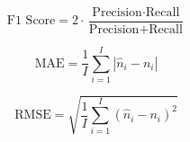 \[
\text{F1 Score} = 2 \cdot \frac{\text{Precision} \cdot \text{Recall}}{\text{Precision} + \text{Recall}}
\]

\[
\text{MAE} = \frac{1}{I} \sum_{i=1}^{I} \left| \hat{n}_i - n_i \right|
\]

\[
\text{RMSE} = \sqrt{\frac{1}{I} \sum_{i=1}^{I} \left( \hat{n}_i - n_i \right)^2}
\]

%


